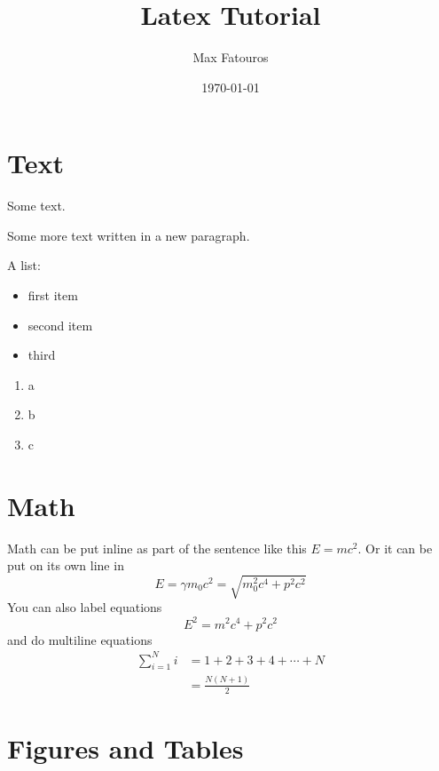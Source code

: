 \documentclass[12pt]{report}
\title{Latex Tutorial}
\author{Max Fatouros}
\date{\today}
\begin{document}
\maketitle

\tableofcontents
\newpage


\section{Text}\label{sec:text}
    Some text.

    Some more text written in a new paragraph.

    A list:
    \begin{itemize}
        \item first item
        \item second item
        \item third
    \end{itemize}

    \begin{enumerate}
        \item a
        \item b
        \item c
    \end{enumerate}


\section{Math}\label{sec:math}
    Math can be put inline as part of the sentence like this $E = mc^2$. Or it can be put on its own line in 
    \[
        E = \gamma m_0c^2 = \sqrt{m_0^2c^4 + p^2c^2}
    \]
    You can also label equations
    \begin{equation}\label{eq:energy-momentum}
        E^2 = m^2c^4 + p^2c^2
    \end{equation}
    and do multiline equations
    \begin{align*}
        \sum^N_{i=1} i &= 1 + 2 + 3 + 4 + \cdots + N\\
                       &= \frac{N(N+1)}{2}
    \end{align*}

\section{Figures and Tables}
\end{document}
